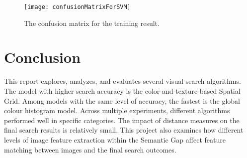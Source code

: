 \documentclass{article}
\begin{document}
\begin{figure}[h]
  \begin{center}
  \texttt{[image: confusionMatrixForSVM]}
  \end{center}
  \caption{\label{fig:confusion} The confusion matrix for the training result.}
  \end{figure}


\section{Conclusion}

This report explores, analyzes, and evaluates several visual search algorithms. The model with higher search accuracy is the color-and-texture-based Spatial Grid. Among models with the same level of accuracy, the fastest is the global colour histogram model. Across multiple experiments, different algorithms performed well in specific categories. The impact of distance measures on the final search results is relatively small. This project also examines how different levels of image feature extraction within the Semantic Gap affect feature matching between images and the final search outcomes.


\newcommand{\doi}[1]{DOI: \href{http://dx.doi.org/#1}{\nolinkurl{#1}}}



\end{document}
